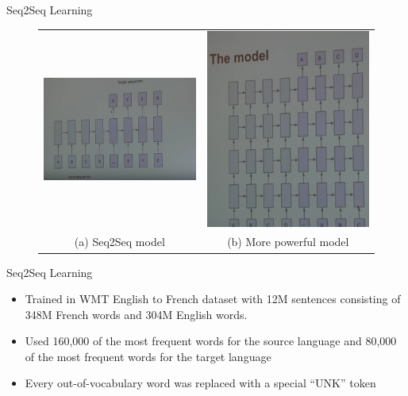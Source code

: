 ﻿\documentclass[table,aspectratio=43,mathserif,xcolor={usenames,dvipsnames,svgnames,table},10pt]{beamer}
\renewcommand{\footnotesize}{\tiny}
\begin{document}
\begin{frame}{Seq2Seq Learning}
 \begin{figure}
    \centering
    \begin{tabular}{cc}
	\includegraphics[width=.49\linewidth]{images/seq2seq.png} &
	\includegraphics[width=.49\linewidth]{images/seq2seqDeep.png} \\
	\footnotesize(a) Seq2Seq model & \footnotesize(b) More powerful model \\
    \end{tabular}
    \end{figure}
\end{frame}

\begin{frame}{Seq2Seq Learning}
\begin{itemize}
 \item<+->  Trained in WMT English to French dataset with 12M sentences consisting of 348M French words and 304M English words.
 \item<+->  Used 160,000 of the most frequent words for the source language and 80,000 of the most frequent words for the target language
 \item<+->  Every out-of-vocabulary word was replaced with a special “UNK” token
\end{itemize}
\end{frame}
\end{document}
